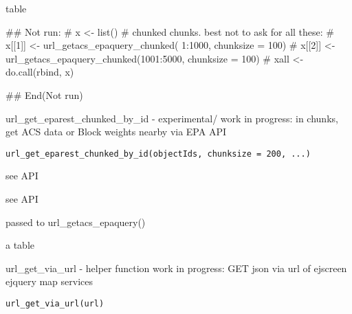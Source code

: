 \documentclass[a4paper]{book}
\begin{document}
%
\begin{Value}
table
\end{Value}
%
\begin{Examples}
\begin{ExampleCode}
## Not run: 
 # x <- list() # chunked chunks. best not to ask for all these:
 # x[[1]] <- url_getacs_epaquery_chunked(   1:1000, chunksize = 100)
 # x[[2]] <- url_getacs_epaquery_chunked(1001:5000, chunksize = 100)
 # xall <- do.call(rbind, x)
 
## End(Not run) 
\end{ExampleCode}
\end{Examples}
%
\begin{Description}\relax
url\_get\_eparest\_chunked\_by\_id - experimental/ work in progress: in chunks, get ACS data or Block weights nearby via EPA API
\end{Description}
%
\begin{Usage}
\begin{verbatim}
url_get_eparest_chunked_by_id(objectIds, chunksize = 200, ...)
\end{verbatim}
\end{Usage}
%
\begin{Arguments}
\begin{ldescription}
\item[\code{objectIds}] see API

\item[\code{chunksize}] see API

\item[\code{...}] passed to url\_getacs\_epaquery()
\end{ldescription}
\end{Arguments}
%
\begin{Value}
a table
\end{Value}
%
\begin{Description}\relax
url\_get\_via\_url - helper function work in progress: GET json via url of ejscreen ejquery map services
\end{Description}
%
\begin{Usage}
\begin{verbatim}
url_get_via_url(url)
\end{verbatim}
\end{Usage}
\end{document}
